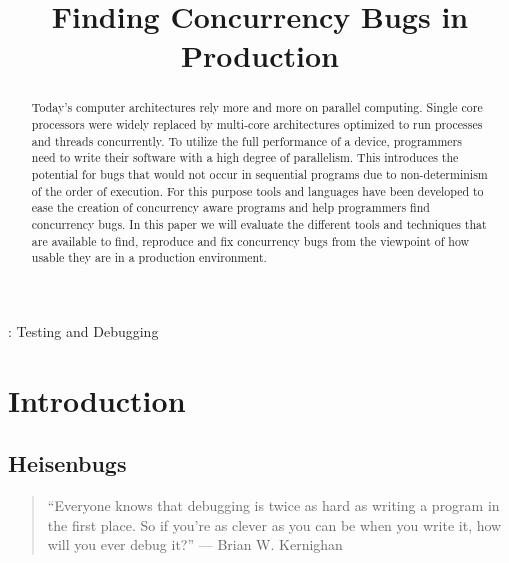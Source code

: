 \documentclass[conference]{IEEEtran}
\begin{document}
\title{Finding Concurrency Bugs in Production}

\author{
}

\maketitle

\begin{abstract}
Today's computer architectures rely more and more on parallel computing.
Single core processors were widely replaced by multi-core architectures optimized to run processes and threads concurrently.
To utilize the full performance of a device, programmers need to write their software with a high degree of parallelism.
This introduces the potential for bugs that would not occur in sequential programs due to non-determinism of the order of execution.
For this purpose tools and languages have been developed to ease the creation of concurrency aware programs and help programmers find concurrency bugs.
In this paper we will evaluate the different tools and techniques that are available to find, reproduce and fix concurrency bugs from the viewpoint of how usable they are in a production environment.
\end{abstract}

\begin{IEEEkeywords}
    : Testing and Debugging
\end{IEEEkeywords}


\section{Introduction}

\subsection{Heisenbugs}

\begin{quote}
``Everyone knows that debugging is twice as hard as writing a program in the first place. So if you're as clever as you can be when you write it, how will you ever debug it?'' --- Brian W. Kernighan\cite{kernighan1974elements}
\end{quote}
\end{document}
